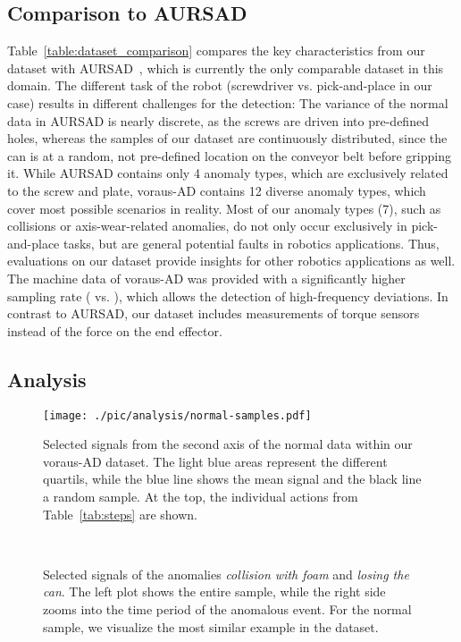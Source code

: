 \documentclass[journal]{IEEEtran}
\newcommand\datasetname{voraus-AD}
\begin{document}
\subsection{Comparison to AURSAD}
\label{dataset_comparison}
Table~\ref{table:dataset_comparison} compares the key characteristics from our dataset with AURSAD~\cite{aursad}, which is currently the only comparable dataset in this domain.
The different task of the robot (screwdriver vs. pick-and-place in our case) results in different challenges for the detection:
The variance of the normal data in AURSAD is nearly discrete, as the screws are driven into pre-defined holes, whereas the samples of our dataset are continuously distributed, since the can is at a random, not pre-defined location on the conveyor belt before gripping it.
While AURSAD contains only 4 anomaly types, which are exclusively related to the screw and plate, \datasetname{} contains 12 diverse anomaly types, which cover most possible scenarios in reality.
Most of our anomaly types (7), such as collisions or axis-wear-related anomalies, do not only occur exclusively in pick-and-place tasks, but are general potential faults in robotics applications.
Thus, evaluations on our dataset provide insights for other robotics applications as well.
The machine data of \datasetname{} was provided with a significantly higher sampling rate ( vs. ), which allows the detection of high-frequency deviations.
In contrast to AURSAD, our dataset includes measurements of torque sensors instead of the force on the end effector.

\subsection{Analysis}
\begin{figure}[!t]
    \centering
    \texttt{[image: ./pic/analysis/normal-samples.pdf]}
    \caption{Selected signals from the second axis of the normal data within our \datasetname{} dataset. The light blue areas represent the different quartils, while the blue line shows the mean signal and the black line a random sample. At the top, the individual actions from Table~\ref{tab:steps} are shown.}
    \label{fig:normal_quali}
    \vspace{-4mm}
\end{figure}


\begin{figure}[!htb]
    \centering
    \\
    \vspace{-2mm}
    \caption{Selected signals of the anomalies \textit{collision with foam} and \textit{losing the can}. The left plot shows the entire sample, while the right side zooms into the time period of the anomalous event. For the normal sample, we visualize the most similar example in the dataset.}
    \label{fig:ano_signals}
    \vspace{-3mm}
\end{figure}
\end{document}

